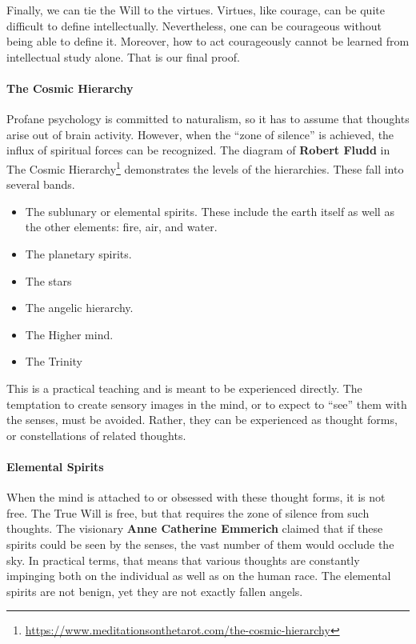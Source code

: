 Finally, we can tie the Will to the virtues. Virtues, like courage, can be quite difficult to define intellectually. Nevertheless, one can be courageous without being able to define it. Moreover, how to act courageously cannot be learned from intellectual study alone. That is our final proof.

\paragraph{The Cosmic Hierarchy}


Profane psychology is committed to naturalism, so it has to assume that thoughts arise out of brain activity. However, when the ``zone of silence'' is achieved, the influx of spiritual forces can be recognized. The diagram of \textbf{Robert Fludd} in The Cosmic Hierarchy\footnote{\url{https://www.meditationsonthetarot.com/the-cosmic-hierarchy}} demonstrates the levels of the hierarchies. These fall into several bands.

\begin{itemize}


\item The sublunary or elemental spirits. These include the earth itself as well as the other elements: fire, air, and water.

\item The planetary spirits.

\item The stars

\item The angelic hierarchy.

\item The Higher mind.

\item The Trinity
\end{itemize}


This is a practical teaching and is meant to be experienced directly. The temptation to create sensory images in the mind, or to expect to ``see'' them with the senses, must be avoided. Rather, they can be experienced as thought forms, or constellations of related thoughts.

\paragraph{Elemental Spirits}


When the mind is attached to or obsessed with these thought forms, it is not free. The True Will is free, but that requires the zone of silence from such thoughts. The visionary \textbf{Anne Catherine Emmerich} claimed that if these spirits could be seen by the senses, the vast number of them would occlude the sky. In practical terms, that means that various thoughts are constantly impinging both on the individual as well as on the human race. The elemental spirits are not benign, yet they are not exactly fallen angels.

